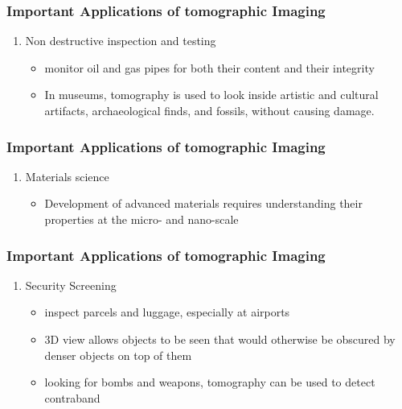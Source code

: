 \documentclass{beamer}
\newcounter{saveenumi}
\newcommand{\seti}{\setcounter{saveenumi}{\value{enumi}}}
\newcommand{\conti}{\setcounter{enumi}{\value{saveenumi}}}
\begin{document}
\begin{frame}
	\frametitle{Important Applications of tomographic Imaging}
	\begin{enumerate}
			\conti
		\item Non destructive inspection and testing
			\begin{itemize}
				\item monitor oil and gas pipes for both their content and their integrity
				\item In museums, tomography is used to look inside artistic and cultural artifacts, archaeological finds, and fossils, without causing damage.
			\end{itemize}
	\seti
	\end{enumerate}
\end{frame}
\begin{frame}
	\frametitle{Important Applications of tomographic Imaging}
	\begin{enumerate}
			\conti
		\item Materials science
			\begin{itemize}
				\item Development of advanced materials requires understanding their properties at the micro- and nano-scale
			\end{itemize}
	\seti
	\end{enumerate}
\end{frame}
\begin{frame}
	\frametitle{Important Applications of tomographic Imaging}
	\begin{enumerate}
			\conti
		\item Security Screening
			\begin{itemize}
				\item inspect parcels and luggage, especially at airports
				\item 3D view allows objects to be seen that would otherwise be obscured by denser objects on top of them
				\item looking for bombs and weapons, tomography can be used to detect contraband
			\end{itemize}
	\end{enumerate}
\end{frame}
\end{document}

